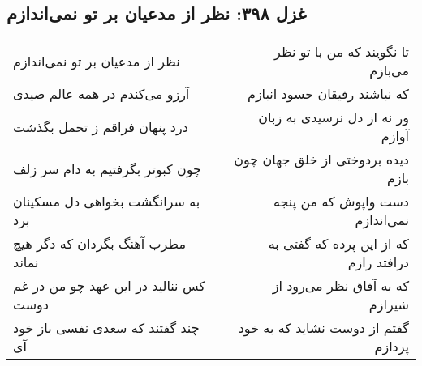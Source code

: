 \begin{center}
\section*{غزل ۳۹۸: نظر از مدعیان بر تو نمی‌اندازم}
\label{sec:398}
\begin{longtable}{l p{0.5cm} r}
نظر از مدعیان بر تو نمی‌اندازم
&&
تا نگویند که من با تو نظر می‌بازم
\\
آرزو می‌کندم در همه عالم صیدی
&&
که نباشند رفیقان حسود انبازم
\\
درد پنهان فراقم ز تحمل بگذشت
&&
ور نه از دل نرسیدی به زبان آوازم
\\
چون کبوتر بگرفتیم به دام سر زلف
&&
دیده بردوختی از خلق جهان چون بازم
\\
به سرانگشت بخواهی دل مسکینان برد
&&
دست واپوش که من پنجه نمی‌اندازم
\\
مطرب آهنگ بگردان که دگر هیچ نماند
&&
که از این پرده که گفتی به درافتد رازم
\\
کس ننالید در این عهد چو من در غم دوست
&&
که به آفاق نظر می‌رود از شیرازم
\\
چند گفتند که سعدی نفسی باز خود آی
&&
گفتم از دوست نشاید که به خود پردازم
\\
\end{longtable}
\end{center}
